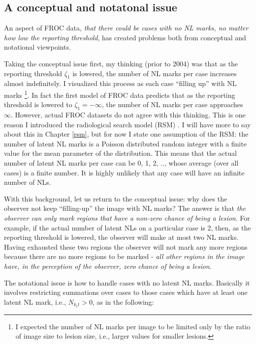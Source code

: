 \documentclass[
]{book}
\begin{document}
\hypertarget{empirical-indexing-marks}{%
\subsection{A conceptual and notatonal issue}\label{empirical-indexing-marks}}

An aspect of FROC data, \emph{that there could be cases with no NL marks, no matter how low the reporting threshold}, has created problems both from conceptual and notational viewpoints.

Taking the conceptual issue first, my thinking (prior to 2004) was that as the reporting threshold \(\zeta_1\) is lowered, the number of NL marks per case increases almost indefinitely. I visualized this process as each case ``filling up'' with NL marks \footnote{I expected the number of NL marks per image to be limited only by the ratio of image size to lesion size, i.e., larger values for smaller lesions.}. In fact the first model of FROC data \citep{chakraborty1989maximum} predicts that as the reporting threshold is lowered to \(\zeta_1 = -\infty\), the number of NL marks per case approaches \(\infty\). However, actual FROC datasets do not agree with this thinking. This is one reason I introduced the radiological search model (RSM) \citep{chakraborty2006search}. I will have more to say about this in Chapter \ref{rsm}, but for now I state one assumption of the RSM: the number of latent NL marks is a Poisson distributed random integer with a finite value for the mean parameter of the distribution. This means that the actual number of latent NL marks per case can be 0, 1, 2, .., whose average (over all cases) is a finite number. It is highly unlikely that any case will have an infinite number of NLs.

With this background, let us return to the conceptual issue: why does the observer not keep ``filling-up'' the image with NL marks? The answer is that \emph{the observer can only mark regions that have a non-zero chance of being a lesion}. For example, if the actual number of latent NLs on a particular case is 2, then, as the reporting threshold is lowered, the observer will make at most two NL marks. Having exhausted these two regions the observer will not mark any more regions because there are no more regions to be marked - \emph{all other regions in the image have, in the perception of the observer, zero chance of being a lesion}.

The notational issue is how to handle cases with no latent NL marks. Basically it involves restricting summations over cases to those cases which have at least one latent NL mark, i.e., \(N_{k_t t} > 0\), as in the following:
\end{document}
